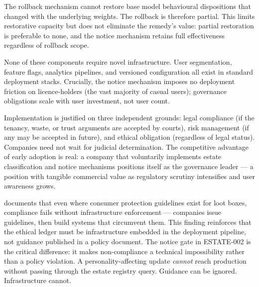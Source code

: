 The rollback mechanism cannot restore base model behavioural dispositions that changed with the underlying weights. The rollback is therefore partial. This limits restorative capacity but does not eliminate the remedy's value: partial restoration is preferable to none, and the notice mechanism retains full effectiveness regardless of rollback scope.

None of these components require novel infrastructure. User segmentation, feature flags, analytics pipelines, and versioned configuration all exist in standard deployment stacks. Crucially, the notice mechanism imposes no deployment friction on licence-holders (the vast majority of casual users); governance obligations scale with user investment, not user count.

Implementation is justified on three independent grounds: legal compliance (if the tenancy, waste, or trust arguments are accepted by courts), risk management (if any may be accepted in future), and ethical obligation (regardless of legal status). Companies need not wait for judicial determination. The competitive advantage of early adoption is real: a company that voluntarily implements estate classification and notice mechanisms positions itself as the governance leader --- a position with tangible commercial value as regulatory scrutiny intensifies and user awareness grows.

\textcite{xiao2025lootbox} documents that even where consumer protection guidelines exist for loot boxes, compliance fails without infrastructure enforcement --- companies issue guidelines, then build systems that circumvent them. This finding reinforces that the ethical ledger must be infrastructure embedded in the deployment pipeline, not guidance published in a policy document. The notice gate in ESTATE-002 is the critical difference: it makes non-compliance a technical impossibility rather than a policy violation. A personality-affecting update \emph{cannot} reach production without passing through the estate registry query. Guidance can be ignored. Infrastructure cannot.

